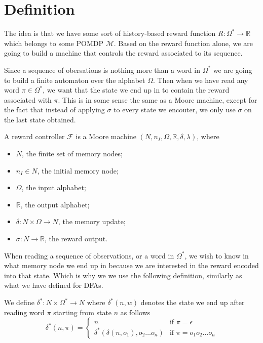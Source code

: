 \section{Definition}

The idea is that we have some sort of history-based reward function $R:\Omega^*\to\mathbb{R}$ which belongs to some POMDP $\mathcal{M}$. Based on the reward function alone, we are going to build a machine that controls the reward associated to its sequence. 

Since a sequence of obersations is nothing more than a word in $\Omega^*$ we are going to build a finite automaton over the alphabet $\Omega$. Then when we have read any word $\pi\in\Omega^*$, we want that the state we end up in to contain the reward associated with $\pi$. This is in some sense the same as a Moore machine, except for the fact that instead of applying $\sigma$ to every state we encouter, we only use $\sigma$ on the last state obtained. 

\begin{definition}
	A reward controller $\mathcal{F}$ is a Moore machine $(N,n_I, \Omega, \mathbb{R}, \delta, \lambda)$, where
	\begin{itemize}
		\item $N$, the finite set of memory nodes;
		\item $n_I\in N$, the initial memory node;
		\item $\Omega$, the input alphabet;
		\item $\mathbb{R}$, the output alphabet;
		\item $\delta: N \times \Omega \to N$, the memory update;
		\item $\sigma: N \to \mathbb{R}$, the reward output. 
	\end{itemize}
\end{definition}

When reading a sequence of observations, or a word in $\Omega^*$, we wish to know in what memory node we end up in because we are interested in the reward encoded into that state. Which is why we we use the following definition, similarly as what we have defined for DFAs.

\begin{definition}
We define $\delta^*:N\times\Omega^*\to N$ where $\delta^*(n,w)$ denotes the state we end up after reading word $\pi$ starting from state $n$ as follows
\begin{equation*}
\delta^*(n,\pi)=\begin{cases}
	n &\text{if } \pi=\epsilon \\
	\delta^*(\delta(n,o_1),o_2\dots o_n) & \text{if } \pi=o_1 o_2\dots o_n
	\end{cases}
\end{equation*}
\label{d:delta_star_rc}
\end{definition}
